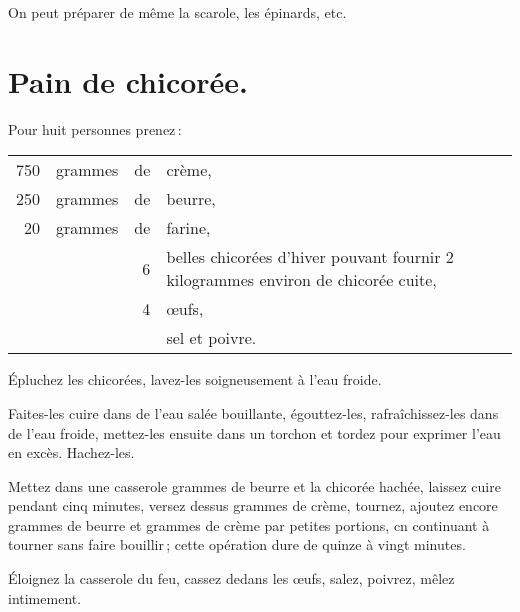 \sk

On peut préparer de même la scarole, les épinards, etc.

\section*{\centering Pain de chicorée.}
{}

Pour huit personnes prenez :

\footnotesize
\begin{longtable}{rrrp{16em}}
    750 & grammes & de & crème,                                                                           \\
    250 & grammes & de & beurre,                                                                          \\
     20 & grammes & de & farine,                                                                          \\
        &         &  6 & belles chicorées d'hiver pouvant fournir 2 kilogrammes
                         environ de chicorée cuite,                                                       \\
        &         &  4 & œufs,                                                                            \\
        &         &    & sel et poivre.                                                                   \\
\end{longtable}
\normalsize

Épluchez les chicorées, lavez-les soigneusement à l’eau froide.

Faites-les cuire dans de l'eau salée bouillante, égouttez-les, rafraîchissez-les
dans de l'eau froide, mettez-les ensuite dans un torchon et tordez pour exprimer
l'eau en excès. Hachez-les.

Mettez dans une casserole {\mmm} grammes de beurre et la chicorée hachée,
laissez cuire pendant cinq minutes, versez dessus {\mmm} grammes de
crème, tournez, ajoutez encore {\mmm} grammes de beurre et {\mmm}
grammes de crème par petites portions, cn continuant à tourner sans faire
bouillir ; cette opération dure de quinze à vingt minutes.

Éloignez la casserole du feu, cassez dedans les œufs, salez, poivrez, mêlez
intimement.


